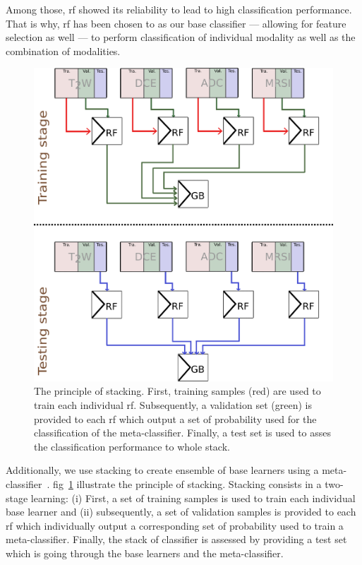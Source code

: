 Among those, \ac{rf} showed its reliability to lead to high classification performance.
That is why, \ac{rf} has been chosen to as our base classifier --- allowing for feature selection as well --- to perform classification of individual modality as well as the combination of modalities.

\begin{figure}
  \centering
  \includegraphics[width=0.5\linewidth]{6_pipeline/figures/stacking_gb.png}
  \caption[The principle of stacking.]{The principle of stacking. First, training samples (red) are used to train each individual \ac{rf}. Subsequently, a validation set (green) is provided to each \ac{rf} which output a set of probability used for the classification of the meta-classifier. Finally, a test set is used to asses the classification performance to whole stack.}
  \label{fig:stacking}
\end{figure}

Additionally, we use stacking to create ensemble of base learners using a meta-classifier~\cite{wolpert1992stacked}.
\Acl{fig}~\ref{fig:stacking} illustrate the principle of stacking.
Stacking consists in a two-stage learning:
(i) First, a set of training samples is used to train each individual base learner and
(ii) subsequently, a set of validation samples is provided to each \ac{rf} which individually output a corresponding set of probability used to train a meta-classifier.
Finally, the stack of classifier is assessed by providing a test set which is going through the base learners and the meta-classifier.
